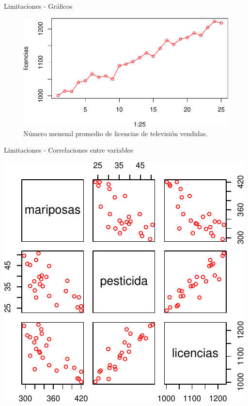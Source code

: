 \documentclass[
  11pt,
  ignorenonframetext,
]{beamer}
\begin{document}
\begin{frame}{Limitaciones - Gráficos}
\protect\hypertarget{limitaciones---gruxe1ficos-2}{}
\begin{figure}
\centering
\includegraphics{Correlacion_files/figure-beamer/unnamed-chunk-10-1.pdf}
\caption{Número mensual promedio de licencias de televisión vendidas.}
\end{figure}
\end{frame}

\begin{frame}{Limitaciones - Correlaciones entre variables}
\protect\hypertarget{limitaciones---correlaciones-entre-variables}{}
\begin{center}\includegraphics{Correlacion_files/figure-beamer/unnamed-chunk-11-1} \end{center}
\end{frame}
\end{document}
